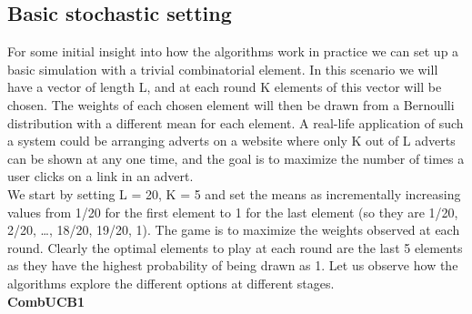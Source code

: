 \subsection{Basic stochastic setting}

For some initial insight into how the algorithms work in practice we can set up a basic simulation with a trivial combinatorial element. In this scenario we will have a vector of length L, and at each round K elements of this vector will be chosen. The weights of each chosen element will then be drawn from a Bernoulli distribution with a different mean for each element. A real-life application of such a system could be arranging adverts on a website where only K out of L adverts can be shown at any one time, and the goal is to maximize the number of times a user clicks on a link in an advert.\\

We start by setting L = 20, K = 5 and set the means as incrementally increasing values from 1/20 for the first element to 1 for the last element (so they are 1/20, 2/20, \ldots, 18/20, 19/20, 1). The game is to maximize the weights observed at each round. Clearly the optimal elements to play at each round are the last 5 elements as they have the highest probability of being drawn as 1. Let us observe how the algorithms explore the different options at different stages.\\


\noindent \textbf{CombUCB1}\\



